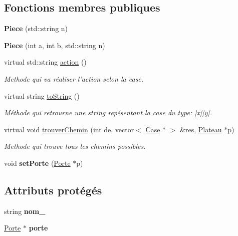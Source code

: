 \subsection*{\-Fonctions membres publiques}
\begin{DoxyCompactItemize}
\item 
\hypertarget{classPiece_a81b2270c38239330249ed0e3188071ce}{{\bfseries \-Piece} (std\-::string n)}\label{classPiece_a81b2270c38239330249ed0e3188071ce}

\item 
\hypertarget{classPiece_a853e5114a396a009ff046af8e3ba6f5b}{{\bfseries \-Piece} (int a, int b, std\-::string n)}\label{classPiece_a853e5114a396a009ff046af8e3ba6f5b}

\item 
\hypertarget{classPiece_ae2bbb51808f5d87be1761df503571e0d}{virtual std\-::string \hyperlink{classPiece_ae2bbb51808f5d87be1761df503571e0d}{action} ()}\label{classPiece_ae2bbb51808f5d87be1761df503571e0d}

\begin{DoxyCompactList}\small\item\em \-Methode qui va réaliser l'action selon la case. \end{DoxyCompactList}\item 
virtual string \hyperlink{classPiece_ae18523c400cb72a50bb1293d27cd1432}{to\-String} ()
\begin{DoxyCompactList}\small\item\em \-Méthode qui retrourne une string repésentant la case du type\-: \mbox{[}x\mbox{]}\mbox{[}y\mbox{]}. \end{DoxyCompactList}\item 
virtual void \hyperlink{classPiece_ab8f478c95ba4d853c9016d19211e2be1}{trouver\-Chemin} (int de, vector$<$ \hyperlink{classCase}{\-Case} $\ast$ $>$ \&res, \hyperlink{classPlateau}{\-Plateau} $\ast$p)
\begin{DoxyCompactList}\small\item\em \-Methode qui trouve tous les chemins possibles. \end{DoxyCompactList}\item 
\hypertarget{classPiece_afd9fcbb17752f925bd3104acbf271190}{void {\bfseries set\-Porte} (\hyperlink{classPorte}{\-Porte} $\ast$p)}\label{classPiece_afd9fcbb17752f925bd3104acbf271190}

\end{DoxyCompactItemize}
\subsection*{\-Attributs protégés}
\begin{DoxyCompactItemize}
\item 
\hypertarget{classPiece_ad6f31cca0e9343e1ea56cfaf990f3f1e}{string {\bfseries nom\-\_\-}}\label{classPiece_ad6f31cca0e9343e1ea56cfaf990f3f1e}

\item 
\hypertarget{classPiece_ab75a6524350e4e783f7f4980d47e9e02}{\hyperlink{classPorte}{\-Porte} $\ast$ {\bfseries porte}}\label{classPiece_ab75a6524350e4e783f7f4980d47e9e02}

\end{DoxyCompactItemize}


